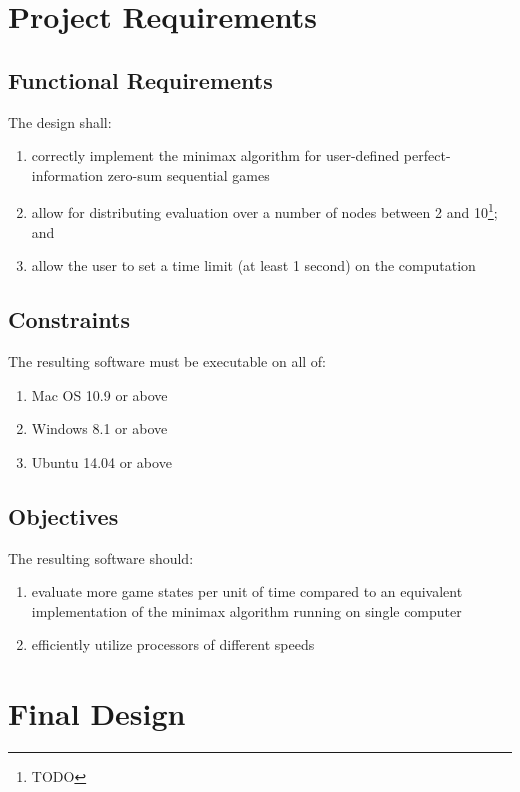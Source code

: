 \documentclass[pdftex,12pt,a4paper]{article}
\begin{document}
%
%
\section{Project Requirements}

\subsection{Functional Requirements}

The design shall:
\begin{enumerate}
\item correctly implement the minimax algorithm for user-defined perfect-information zero-sum sequential games
\item allow for distributing evaluation over a number of nodes between 2 and 10\footnote{TODO}; and
\item allow the user to set a time limit (at least 1 second) on the computation
\end{enumerate}

\subsection{Constraints}

The resulting software must be executable on all of:
\begin{enumerate}
\item Mac OS 10.9 or above
\item Windows 8.1 or above
\item Ubuntu 14.04 or above
\end{enumerate}

\subsection{Objectives}\label{sec:objectives}

The resulting software should:
\begin{enumerate}
\item evaluate more game states per unit of time compared to an equivalent implementation of the minimax algorithm running on single computer
\item\label{itm:obj-efficiency} efficiently utilize processors of different speeds
\end{enumerate}


\section{Final Design}
\end{document}
